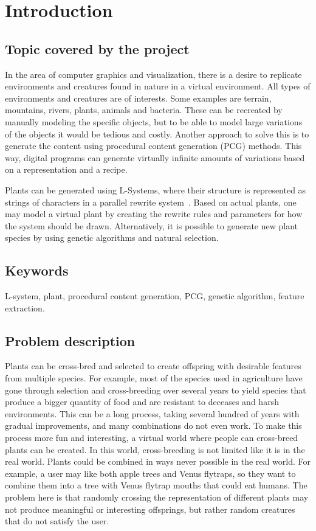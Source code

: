 \chapter{Introduction}
\label{chap:introduction}

\section{Topic covered by the project}
In the area of computer graphics and visualization, there is a desire to replicate environments and creatures found in nature in a virtual environment.
All types of environments and creatures are of interests.
Some examples are terrain, mountains, rivers, plants, animals and bacteria.
These can be recreated by manually modeling the specific objects, but to be able to model large variations of the objects it would be tedious and costly.
Another approach to solve this is to generate the content using procedural content generation (PCG) methods.
This way, digital programs can generate virtually infinite amounts of variations based on a representation and a recipe.

Plants can be generated using L-Systems, where their structure is represented as strings of characters in a parallel rewrite system~\cite{2012Prusinkiewicz}.
Based on actual plants, one may model a virtual plant by creating the rewrite rules and parameters for how the system should be drawn.
Alternatively, it is possible to generate new plant species by using genetic algorithms and natural selection.

\section{Keywords}
L-system, plant, procedural content generation, PCG, genetic algorithm, feature extraction.

\section{Problem description}
\label{sec:ProblemDescription}
Plants can be cross-bred and selected to create offspring with desirable features from multiple species.
For example, most of the species used in agriculture have gone through selection and cross-breeding over several years to yield species that produce a bigger quantity of food and are resistant to deceases and harsh environments.
This can be a long process, taking several hundred of years with gradual improvements, and many combinations do not even work.
To make this process more fun and interesting, a virtual world where people can cross-breed plants can be created.
In this world, cross-breeding is not limited like it is in the real world.
Plants could be combined in ways never possible in the real world.
For example, a user may like both apple trees and Venus flytraps, so they want to combine them into a tree with Venus flytrap mouths that could eat humans.
The problem here is that randomly crossing the representation of different plants may not produce meaningful or interesting offsprings, but rather random creatures that do not satisfy the user.

